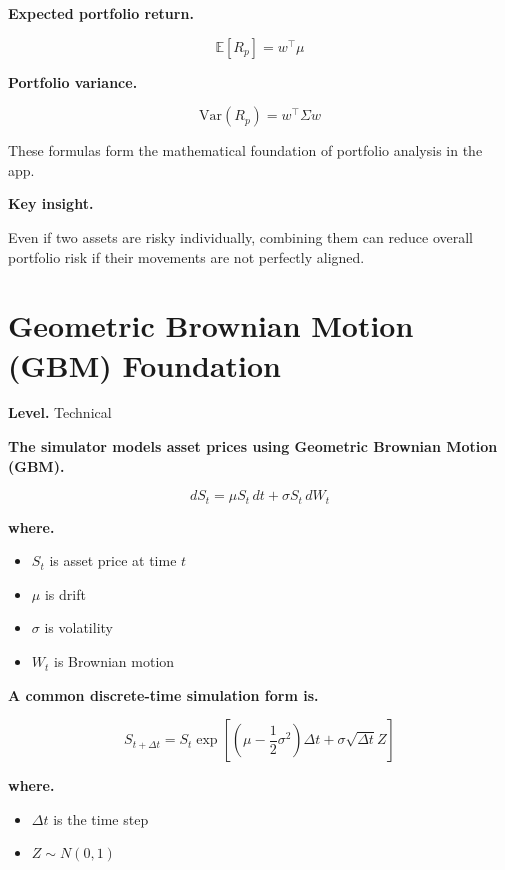 \documentclass[11pt]{report}
\begin{document}
\textbf{Expected portfolio return.}

\begin{equation}
\mathbb{E}[R_p] = w^\top \mu
\end{equation}

\textbf{Portfolio variance.}

\begin{equation}
\mathrm{Var}(R_p) = w^\top \Sigma w
\end{equation}

These formulas form the mathematical foundation of portfolio analysis in the app.

\textbf{Key insight.}

Even if two assets are risky individually, combining them can reduce overall portfolio risk if their movements are not perfectly aligned.

\section{Geometric Brownian Motion (GBM) Foundation}
\begin{callout}
\textbf{Level.} Technical
\end{callout}

\textbf{The simulator models asset prices using Geometric Brownian Motion (GBM).}

\begin{equation}
dS_t = \mu S_t \, dt + \sigma S_t \, dW_t
\end{equation}

\textbf{where.}

\begin{itemize}
\item $S_t$ is asset price at time $t$
\item $\mu$ is drift
\item $\sigma$ is volatility
\item $W_t$ is Brownian motion
\end{itemize}

\textbf{A common discrete-time simulation form is.}

\begin{equation}
S_{t+\Delta t} = S_t \exp\left[
\left(\mu - \frac{1}{2}\sigma^2\right)\Delta t
+ \sigma \sqrt{\Delta t} Z
\right]
\end{equation}

\textbf{where.}

\begin{itemize}
\item $\Delta t$ is the time step
\item $Z \sim N(0,1)$
\end{itemize}
\end{document}
